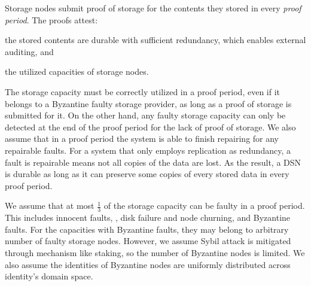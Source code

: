 Storage nodes submit proof of storage for the contents they stored in every \emph{proof period}.
The proofs attest:
\begin{enumerate*}
    \item the stored contents are durable with sufficient redundancy, which enables external auditing, and
    \item the utilized capacities of storage nodes.
\end{enumerate*}
The storage capacity must be correctly utilized in a proof period, even if it belongs to a Byzantine faulty storage provider, as long as a proof of storage is submitted for it.
On the other hand, any faulty storage capacity can only be detected at the end of the proof period for the lack of proof of storage.
We also assume that in a proof period the system is able to finish repairing for any repairable faults.
For a system that only employs replication as redundancy, a fault is repairable means not all copies of the data are lost.
As the result, a DSN is durable as long as it can preserve some copies of every stored data in every proof period.

We assume that at most $\frac{1}{3}$ of the storage capacity can be faulty in a proof period.
This includes innocent faults, \eg, disk failure and node churning, and Byzantine faults.
For the capacities with Byzantine faults, they may belong to arbitrary number of faulty storage nodes.
However, we assume Sybil attack is mitigated through mechanism like staking, so the number of Byzantine nodes is limited.
We also assume the identities of Byzantine nodes are uniformly distributed across identity's domain space.


